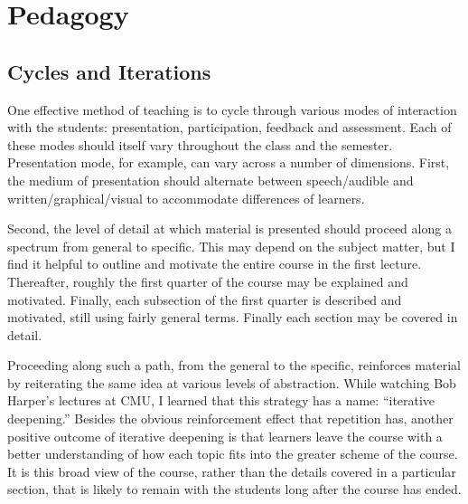 \pagestyle{fancy} 
 \lfoot{} \rfoot{\thepage} \cfoot{}

\bigskip

\section{Pedagogy}

\smallskip

\subsection{Cycles and Iterations}
One effective method of teaching is to cycle through
various modes of interaction with the students:
presentation, participation, feedback and assessment. 
Each of these modes should itself vary throughout the class and the semester.
Presentation mode, for example, can vary across a number of
dimensions.
First, the medium of presentation should
alternate between speech/audible and written/graphical/visual to
accommodate differences of learners.

Second, the
level of detail at which material is presented should proceed along a
spectrum from general to specific.  This may depend on the subject matter,
but I find it helpful to outline and motivate the entire course 
in the first lecture.  Thereafter, roughly the first quarter of
the course may be explained and motivated.  Finally, each subsection
of the first quarter is described and motivated, still using
fairly general terms. Finally each section may be covered in detail.

Proceeding along such a path, from the general to the specific, reinforces material by reiterating the same idea at various levels of abstraction. While watching Bob Harper's lectures at CMU, I learned that this strategy has a name: ``iterative deepening.'' Besides the obvious reinforcement effect that repetition has, another positive outcome of iterative deepening is that learners leave the course with a better understanding of how each topic fits into the greater scheme of the course. It is this broad view of the course, rather than the details covered in a particular section, that is likely to remain with the students long after the course has ended.


\bigskip

